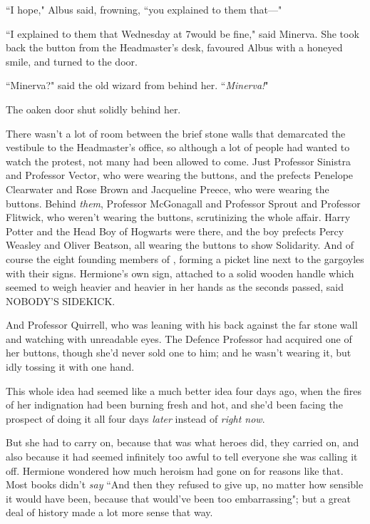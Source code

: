 ``I hope," Albus said, frowning, ``you explained to them that—"

``I explained to them that Wednesday at 7\pm would be fine," said Minerva. She took back the button from the Headmaster's desk, favoured Albus with a honeyed smile, and turned to the door.

``Minerva?" said the old wizard from behind her. ``\emph{Minerva!}"

The oaken door shut solidly behind her.

\later

There wasn't a lot of room between the brief stone walls that demarcated the vestibule to the Headmaster's office, so although a lot of people had wanted to watch the protest, not many had been allowed to come. Just Professor Sinistra and Professor Vector, who were wearing the buttons, and the prefects Penelope Clearwater and Rose Brown and Jacqueline Preece, who were wearing the buttons. Behind \emph{them}, Professor McGonagall and Professor Sprout and Professor Flitwick, who weren't wearing the buttons, scrutinizing the whole affair. Harry Potter and the Head Boy of Hogwarts were there, and the boy prefects Percy Weasley and Oliver Beatson, all wearing the buttons to show Solidarity. And of course the eight founding members of \SPHEW, forming a picket line next to the gargoyles with their signs. Hermione's own sign, attached to a solid wooden handle which seemed to weigh heavier and heavier in her hands as the seconds passed, said NOBODY'S SIDEKICK.

And Professor Quirrell, who was leaning with his back against the far stone wall and watching with unreadable eyes. The Defence Professor had acquired one of her buttons, though she'd never sold one to him; and he wasn't wearing it, but idly tossing it with one hand.

This whole idea had seemed like a much better idea four days ago, when the fires of her indignation had been burning fresh and hot, and she'd been facing the prospect of doing it all four days \emph{later} instead of \emph{right now}.

But she had to carry on, because that was what heroes did, they carried on, and also because it had seemed infinitely too awful to tell everyone she was calling it off. Hermione wondered how much heroism had gone on for reasons like that. Most books didn't \emph{say} ``And then they refused to give up, no matter how sensible it would have been, because that would've been too embarrassing"; but a great deal of history made a lot more sense that way.


